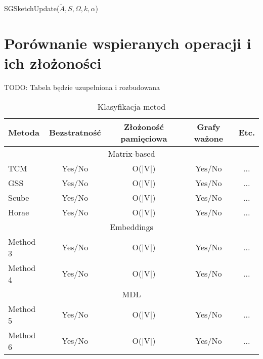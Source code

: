             \begin{algorithm}
                \caption{SGSketchUpdate($\tilde{A},S,\Omega,k,\alpha$)}\label{alg:sg_sketch_update}
            \end{algorithm}


\section{Porównanie wspieranych operacji i ich złożoności}
    TODO: Tabela będzie uzupełniona i rozbudowana

    \begin{table}[htbp]
        \centering
        \caption{Klasyfikacja metod}
        \begin{tabular}{l | c | c | c | c}
        \toprule
        \textbf{Metoda} & \textbf{Bezstratność} & \textbf{Złożoność pamięciowa} & \textbf{Grafy ważone} & \textbf{Etc.} \\
        \midrule
        \multicolumn{5}{c}{Matrix-based} \\
        \midrule
        TCM & Yes/No & O(|V|) & Yes/No & ... \\
        GSS & Yes/No & O(|V|) & Yes/No & ... \\
        Scube & Yes/No & O(|V|) & Yes/No & ... \\
        Horae & Yes/No & O(|V|) & Yes/No & ... \\
        \midrule
        \multicolumn{5}{c}{Embeddings} \\
        \midrule
        Method 3 & Yes/No & O(|V|) & Yes/No & ... \\
        Method 4 & Yes/No & O(|V|) & Yes/No & ... \\
        \midrule
        \multicolumn{5}{c}{MDL} \\
        \midrule
        Method 5 & Yes/No & O(|V|) & Yes/No & ... \\
        Method 6 & Yes/No & O(|V|) & Yes/No & ... \\
        \bottomrule
        \end{tabular}
    \end{table}

